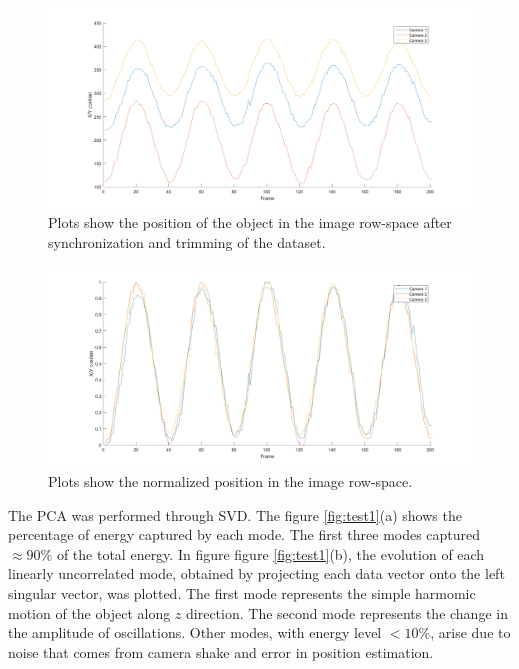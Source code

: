 \documentclass{article}
\begin{document}
\begin{figure}[!b]
  \centering
    \includegraphics[scale=0.2]{./Figures/step1.png}
    \caption{Plots show the position of the object in the image row-space after synchronization and trimming of the dataset.}
  \label{fig:step1}
\end{figure}
\begin{figure}[!t]
  \centering
    \includegraphics[scale=0.2]{./Figures/step2.png}
    \caption{Plots show the normalized position in the image row-space.}
  \label{fig:step2}
\end{figure}

The PCA was performed through SVD. The figure \ref{fig:test1}(a) shows the percentage of energy captured by each mode. The first three modes captured $\approx 90 \%$ of the total energy. In figure figure \ref{fig:test1}(b), the evolution of each linearly uncorrelated mode, obtained by projecting each data vector onto the left singular vector, was plotted. The first mode represents the simple harmomic motion of the object along $z$ direction. The second mode represents the change in the amplitude of oscillations. Other modes, with energy level $<10\%$, arise due to noise that comes from camera shake and error in position estimation.
\end{document}
